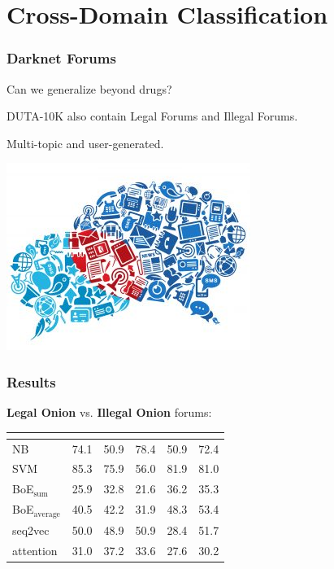 \documentclass[t,xcolor={svgnames,table}]{beamer}
\begin{document}
\section{Cross-Domain Classification}

\begin{frame}
	\frametitle{Darknet Forums}
	
	Can we generalize beyond drugs?
	\vfill
	\pause
	
	DUTA-10K also contain
	{\color{green}Legal Forums} and {\color{red}Illegal Forums}.
	
	Multi-topic and user-generated.
	\vfill
	
	\begin{center}
	\includegraphics[width=.5\textwidth]{forum.jpg}
	\end{center}
\end{frame}

\begin{frame}
	\frametitle{Results}
	
	\textbf{\color{green} Legal Onion} vs. \textbf{\color{red} Illegal Onion} forums:
	
	\begin{center}
		\setlength{\tabcolsep}{8pt}
		\begin{tabular}{l *{5}{R}}
		& 
		& 
		& 
		& 
		& \\
		\hline
		NB & 74.1 & 50.9 & 78.4 & 50.9 & 72.4\\
		SVM & 85.3 & 75.9 & 56.0 & 81.9 & 81.0\\
		BoE$_\mathrm{sum}$ & 25.9 & 32.8 & 21.6 & 36.2 & 35.3\\
		BoE$_\mathrm{average}$ & 40.5 & 42.2 & 31.9 & 48.3 & 53.4\\
		seq2vec & 50.0 & 48.9 & 50.9 & 28.4 & 51.7\\
		attention & 31.0 & 37.2 & 33.6 & 27.6 & 30.2
		\end{tabular}
	\end{center}
\end{frame}
\end{document}
